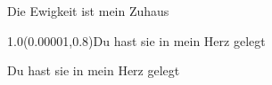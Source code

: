 \documentclass[aspectratio=169]{beamer}
\begin{document}
\color{white}
\begin{frame}
\centering
\huge{Die Ewigkeit ist mein Zuhaus} \\

\begin{textblock}{1.0}(0.00001,0.8)\color{white}\small{Du hast sie in mein Herz gelegt}\end{textblock}
\end{frame}

\begin{frame}
\centering
\huge{Du hast sie in mein Herz gelegt} \\
\end{frame}
\end{document}
